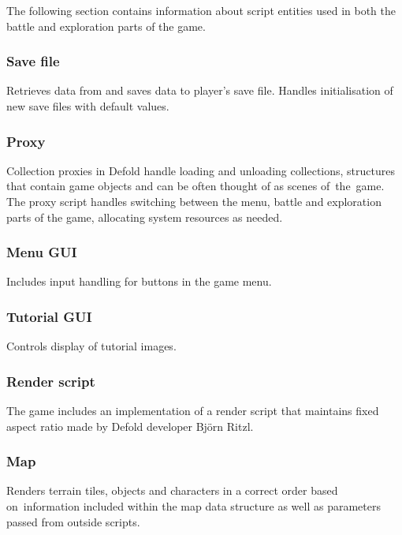 \documentclass[thesis=B,english,hidelinks]{FITthesisXE}[2012/06/26]
\begin{document}
The following section contains information about script entities used in both the battle and exploration parts of the game.

\subsubsection{Save file}

Retrieves data from and saves data to player's save file. Handles initialisation of new save files with default values.

\subsubsection{Proxy}

Collection proxies in Defold handle loading and unloading collections, structures that contain game objects and can be often thought of as scenes of~the~game. The proxy script handles switching between the menu, battle and exploration parts of the game, allocating system resources as needed.

\subsubsection{Menu GUI}

Includes input handling for buttons in the game menu.

\subsubsection{Tutorial GUI}

Controls display of tutorial images.

\subsubsection{Render script}

The game includes an implementation of a render script that maintains fixed aspect ratio made by Defold developer Björn Ritzl\autocite{britzl}.

\subsubsection{Map}

Renders terrain tiles, objects and characters in a correct order based on~information included within the map data structure as well as parameters passed from outside scripts.

\newpage
\end{document}
